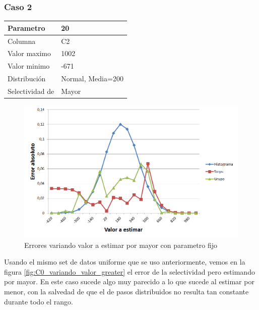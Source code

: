 		\subsubsection*{Caso 2}
		
		\begin{tabular}{| l | l |}
		\hline
		Parametro & 20 \\
		\hline
		Columna & C2 \\
		\hline
		Valor maximo & 1002 \\
		\hline
		Valor minimo & -671 \\
		\hline
		Distribuci\'on & Normal, Media=200 \\
		\hline
		Selectividad de & Mayor \\
		\hline
		\end{tabular}

		\newpage					

	\begin{figure}[H]
	  \begin{center}
	    \includegraphics[scale=.40]{imagenes/C2_variando_valor_greater.png}
	    \caption{Errores variando valor a estimar por mayor con parametro fijo} 
	    \label{fig:C2_variando_valor_greater}
	  \end{center}
	\end{figure}
		
		Usando el mismo set de datos uniforme que se uso anteriormente, vemos en la figura \ref{fig:C0_variando_valor_greater} el error de la selectividad pero estimando por mayor. En este caso sucede algo muy parecido a lo que sucede al estimar por menor, con la salvedad de que el de pasos distribuidos no resulta tan constante durante todo el rango.
		
